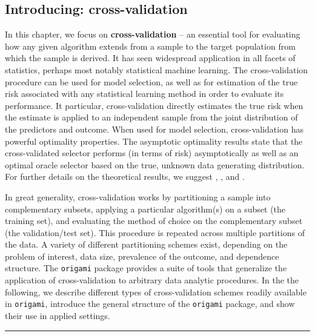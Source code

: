 \documentclass[12pt, krantz2,]{krantz}
\newcommand{\passthrough}[1]{#1}
\theoremstyle{definition}
\theoremstyle{definition}
\theoremstyle{definition}
\newcommand{\1}{\mathbbm{1}}
\begin{document}
\hypertarget{introducing-cross-validation}{%
\subsection{Introducing: cross-validation}\label{introducing-cross-validation}}

In this chapter, we focus on \textbf{cross-validation} -- an essential tool for
evaluating how any given algorithm extends from a sample to the target
population from which the sample is derived. It has seen widespread application
in all facets of statistics, perhaps most notably statistical machine learning.
The cross-validation procedure can be used for model selection, as well as for
estimation of the true risk associated with any statistical learning method in
order to evaluate its performance. It particular, cross-validation directly
estimates the true risk when the estimate is applied to an independent sample
from the joint distribution of the predictors and outcome. When used for model
selection, cross-validation has powerful optimality properties. The asymptotic
optimality results state that the cross-validated selector performs (in terms of
risk) asymptotically as well as an optimal oracle selector based on the true,
unknown data generating distribution. For further details on the theoretical
results, we suggest \citet{vdl2003unified}, \citet{vdl2004asymptotic}, \citet{dudoit2005asymptotics} and
\citet{vaart2006oracle}.

In great generality, cross-validation works by partitioning a sample into
complementary subsets, applying a particular algorithm(s) on a subset (the
training set), and evaluating the method of choice on the complementary subset
(the validation/test set). This procedure is repeated across multiple partitions
of the data. A variety of different partitioning schemes exist, depending on the
problem of interest, data size, prevalence of the outcome, and dependence
structure. The \passthrough{\lstinline!origami!} package provides a suite of tools that generalize the
application of cross-validation to arbitrary data analytic procedures. In the
the following, we describe different types of cross-validation schemes readily
available in \passthrough{\lstinline!origami!}, introduce the general structure of the \passthrough{\lstinline!origami!}
package, and show their use in applied settings.

\begin{center}\rule{0.5\linewidth}{0.5pt}\end{center}
\end{document}
